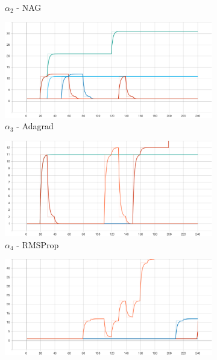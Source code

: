 \begin{figure}[htbp]
\begin{subfigure}{0.5\textwidth}
        \caption{$\alpha_{2}$ - \Acs{NAG}}
        \label{fig:results:case_study:iris:alpha:2}
    \end{subfigure}
    \begin{subfigure}{0.5\textwidth}
        \centering
        \includegraphics[width=\textwidth]{analysis/bhh_case_study/iris/alpha[3].png}
        \caption{$\alpha_{3}$ - \Acs{Adagrad}}
        \label{fig:results:case_study:iris:alpha:3}
    \end{subfigure}
    \par\bigskip
    \begin{subfigure}{0.5\textwidth}
        \centering
        \includegraphics[width=\textwidth]{analysis/bhh_case_study/iris/alpha[4].png}
        \caption{$\alpha_{4}$ - \Acs{RMSProp}}
        \label{fig:results:case_study:iris:alpha:4}
    \end{subfigure}
    \begin{subfigure}{0.5\textwidth}
        \centering
        \includegraphics[width=\textwidth]{analysis/bhh_case_study/iris/alpha[5].png}

\end{subfigure}
\end{figure}
